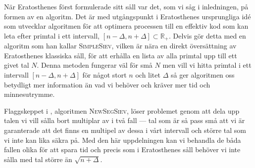 


När Eratosthenes först formulerade sitt såll var det, som vi såg i inledningen, på formen av en algoritm. Det är med utgångspunkt i Eratosthenes ursprungliga idé som \cite{HaraldSieve} utvecklar algoritmen för att optimera processen till en effektiv kod som kan leta efter primtal i ett intervall, $[n - \Delta, n + \Delta] \subset \mathbb{R}_+$. Delvis gör \cite{HaraldSieve} detta med en algoritm som han kallar \textsc{SimpleSiev}, vilken är nära en direkt översättning av Eratosthenes klassiska såll, för att erhålla en lista av alla primtal upp till ett givet tal $N$. Denna metoden fungerar väl för små $N$ men vill vi hitta primtal i ett intervall $[n - \Delta, n + \Delta]$ för något stort $n$ och litet $\Delta$ så ger algoritmen oss betydligt mer information än vad vi behöver och kräver mer tid och minnesutrymme. 

Flaggskeppet i \cite{HaraldSieve}, algoritmen \textsc{NewSegSiev}, löser problemet genom att dela upp talen vi vill sålla bort multiplar av i två fall --- tal som är så pass små att vi är garanterade att det finns en multipel av dessa i vårt intervall och större tal som vi inte kan lika säkra på. Med den här uppdelningen kan vi behandla de båda fallen olika för att spara tid och precis som i Eratosthenes såll behöver vi inte sålla med tal större än \(\sqrt{n + \Delta}\). 

